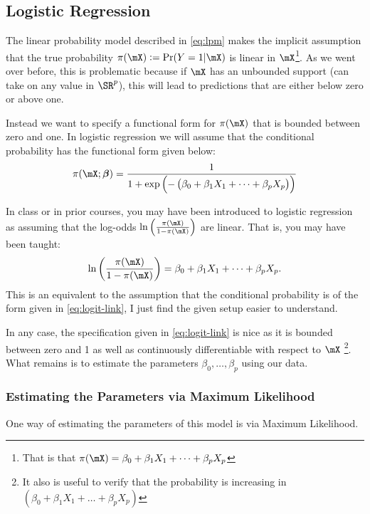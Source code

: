 \documentclass[10pt]{article}
\begin{document}
\subsection{Logistic Regression}%
\label{subsec:logit}

The linear probability model described in \eqref{eq:lpm} makes the implicit assumption that the true probability \(\pi(\mX) := \Pr(Y=1|\mX)\) is linear in \(\mX\)\footnote{That is that \(\pi(\mX) = \beta_0 + \beta_1 X_1 + \dots + \beta_p X_p\)}. As we went over before, this is problematic because if \(\mX\) has an unbounded support (can take on any value in \(\SR^p\)), this will lead to predictions that are either below zero or above one. 

Instead we want to specify a functional form for  \(\pi(\mX)\) that is bounded between zero and one. In logistic regression we will assume that the conditional probability has the functional form given below:
\begin{equation}
	\label{eq:logit-link}
	\pi(\mX;\boldsymbol{\beta}) = \frac{1}{1 + \exp\left(-\left(\beta_0 + \beta_1 X_1 + \dots + \beta_p X_p\right)\right)} 
\end{equation}

In class or in prior courses, you may have been introduced to logistic regression as assuming that the log-odds \(\ln\left(\frac{\pi(\mX)}{1 - \pi(\mX)} \right)\) are linear. That is, you may have been taught:
\[
	\ln\left(\frac{\pi(\mX)}{1 - \pi(\mX)} \right) = \beta_0 + \beta_1 X_1 + \dots+\beta_p X_p
.\] 
This is an equivalent to the assumption that the conditional probability is of the form given in \eqref{eq:logit-link}, I just find the given setup easier to understand.

In any case, the specification given in \eqref{eq:logit-link} is nice as it is bounded between zero and 1 as well as continuously differentiable with respect to \(\mX\) \footnote{It also is useful to verify that the probability is increasing in  \(\left(\beta_0 + \beta_1 X_1 + \dots + \beta_p X_p\right)\)}. What remains is to estimate the parameters \(\beta_0, \dots, \beta_p\) using our data.

\subsubsection{Estimating the Parameters via Maximum Likelihood}%
\label{subsubsec:MLE}

One way of estimating the parameters of this model is via Maximum Likelihood. 
\end{document}
